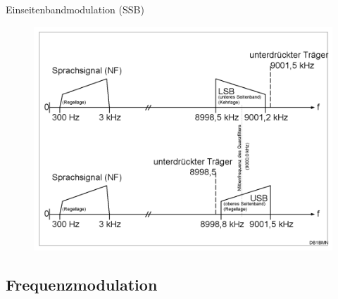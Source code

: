 \begin{frame}{Einseitenbandmodulation (SSB)}
  \begin{center}
    \begin{figure}
      \includegraphics[width=1\textwidth,height=.75\textheight,keepaspectratio]{e16/Ssb-de.png}
    \end{figure}
  \end{center}
\end{frame}




\subsection[FM]{Frequenzmodulation}

